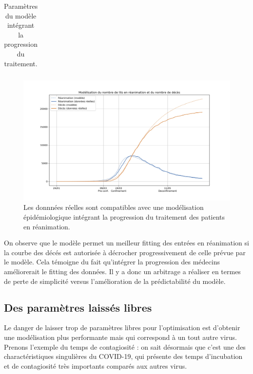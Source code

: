 \documentclass[review]{elsarticle}
\begin{document}
\begin{table}
\small
\begin{center}
\begin{tabular}{|c|c|}
    \hline
 
      \hline
\end{tabular}
\end{center}
\caption{Paramètres du modèle intégrant la progression du traitement.}
\label{table:medecins}
\end{table}

\begin{figure}
\begin{center}
\includegraphics[width=1\linewidth]{figures/medecins.jpg}
\end{center}
\caption{Les donnnées réelles sont compatibles avec une modélisation épidémiologique intégrant la progression du traitement des patients en réanimation.}
\label{figure:medecins}
\end{figure}

On observe que le modèle permet un meilleur fitting des entrées en réanimation si la courbe des décés est autorisée à décrocher progressivement de celle prévue par le modèle. Cela témoigne du fait qu'intégrer la progression des médecins améliorerait le fitting des données. Il y a donc un arbitrage a réaliser en termes de perte de simplicité versus l'amélioration de la prédictabilité du modèle.

\subsection{Des paramètres laissés libres}

Le danger de laisser trop de paramètres libres pour l'optimisation est d'obtenir une modélisation plus performante mais qui correspond à un tout autre virus. Prenons l'exemple du temps de contagiosité : on sait désormais que c'est une des charactéristiques singulières du COVID-19, qui présente des temps d'incubation et de contagiosité très importants comparés aux autres virus.
\end{document}
